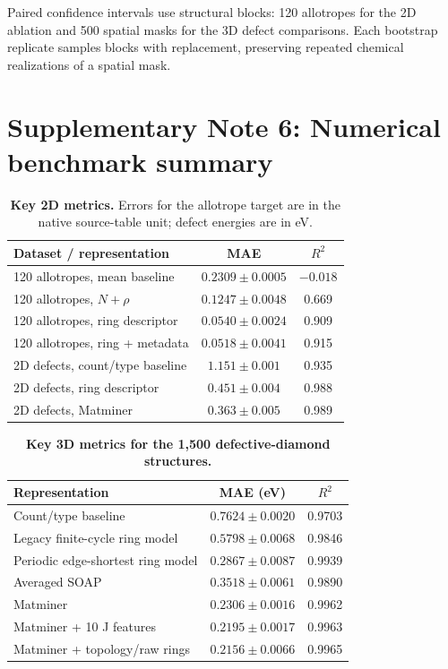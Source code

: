 \documentclass[11pt]{article}
\begin{document}
Paired confidence intervals use structural blocks: 120 allotropes for the 2D ablation and 500 spatial masks for the 3D defect comparisons. Each bootstrap replicate samples blocks with replacement, preserving repeated chemical realizations of a spatial mask.

\section*{Supplementary Note 6: Numerical benchmark summary}

\begin{table}[htbp]
\centering
\caption{\textbf{Key 2D metrics.} Errors for the allotrope target are in the native source-table unit; defect energies are in eV.}
\begin{tabular}{lcc}
\toprule
Dataset / representation & MAE & \(R^2\)\\
\midrule
120 allotropes, mean baseline & \(0.2309\pm0.0005\) & \(-0.018\)\\
120 allotropes, \(N+\rho\) & \(0.1247\pm0.0048\) & 0.669\\
120 allotropes, ring descriptor & \(0.0540\pm0.0024\) & 0.909\\
120 allotropes, ring + metadata & \(0.0518\pm0.0041\) & 0.915\\
2D defects, count/type baseline & \(1.151\pm0.001\) & 0.935\\
2D defects, ring descriptor & \(0.451\pm0.004\) & 0.988\\
2D defects, Matminer & \(0.363\pm0.005\) & 0.989\\
\bottomrule
\end{tabular}
\end{table}

\begin{table}[htbp]
\centering
\caption{\textbf{Key 3D metrics for the 1,500 defective-diamond structures.}}
\begin{tabular}{lcc}
\toprule
Representation & MAE (eV) & \(R^2\)\\
\midrule
Count/type baseline & \(0.7624\pm0.0020\) & 0.9703\\
Legacy finite-cycle ring model & \(0.5798\pm0.0068\) & 0.9846\\
Periodic edge-shortest ring model & \(0.2867\pm0.0087\) & 0.9939\\
Averaged SOAP & \(0.3518\pm0.0061\) & 0.9890\\
Matminer & \(0.2306\pm0.0016\) & 0.9962\\
Matminer + 10 J features & \(0.2195\pm0.0017\) & 0.9963\\
Matminer + topology/raw rings & \(0.2156\pm0.0066\) & 0.9965\\
\bottomrule
\end{tabular}
\end{table}
\end{document}
